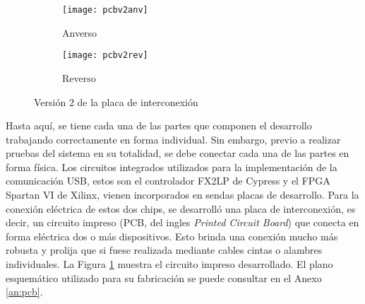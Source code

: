 \begin{figure}[ht]
	\centering
	\begin{subfigure}[t]{0.45\textwidth}
		\centering
		\texttt{[image: pcbv2anv]}
		\caption*{Anverso}
	\end{subfigure}
	\begin{subfigure}[t]{0.45\textwidth}
		\centering
		\texttt{[image: pcbv2rev]}
		\caption*{Reverso}
	\end{subfigure}
	\caption{Versión 2 de la placa de interconexión}
	\label{fpga:pcb:v2}
\end{figure}

Hasta aquí, se tiene cada una de las partes que componen el desarrollo trabajando correctamente en forma individual. Sin embargo, previo a realizar pruebas del sistema en su totalidad, se debe conectar cada una de las partes en forma física. Los circuitos integrados utilizados para la implementación de la comunicación USB, estos son el controlador FX2LP de Cypress y el FPGA Spartan VI de Xilinx, vienen incorporados en sendas placas de desarrollo. Para la conexión eléctrica de estos dos chips, se desarrolló una placa de interconexión, es decir, un circuito impreso (PCB, del ingles {\it Printed Circuit Board}) que conecta en forma eléctrica dos o más dispositivos. Esto brinda una conexión mucho más robusta y prolija que si fuese realizada mediante cables cintas o alambres individuales. La Figura \ref{fpga:pcb:v2} muestra el circuito impreso desarrollado. El plano esquemático utilizado para su fabricación se puede consultar en el Anexo \ref{an:pcb}.

%
%

